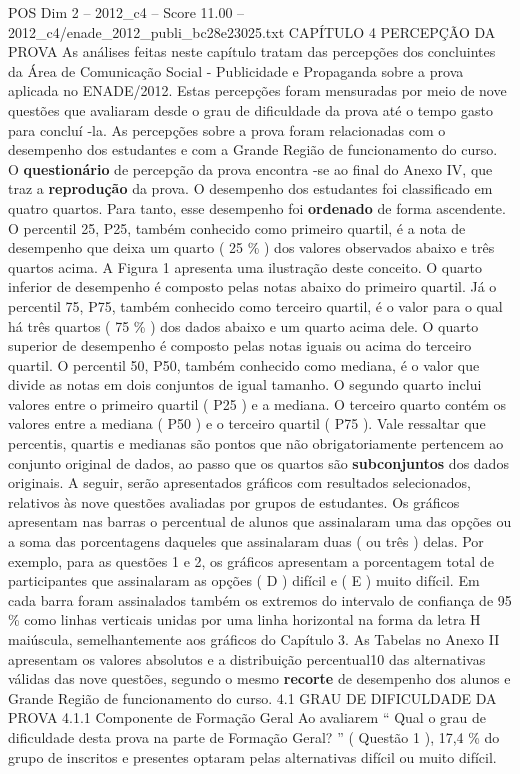 \begin{textsample}{POS Dim 2 – 2012\_c4 – Score 11.00 – 2012\_c4/enade\_2012\_publi\_bc28e23025.txt}  \label{ex:f2_pos_106}
CAPÍTULO 4 PERCEPÇÃO DA PROVA As análises feitas neste capítulo tratam das percepções dos concluintes da Área de Comunicação Social - Publicidade e Propaganda sobre a prova aplicada no ENADE/2012.
Estas percepções foram mensuradas por meio de nove questões que avaliaram desde o grau de dificuldade da prova até o tempo gasto para concluí -la.
As percepções sobre a prova foram relacionadas com o desempenho dos estudantes e com a Grande Região de funcionamento do curso.
O \textbf{questionário} de percepção da prova encontra -se ao final do Anexo IV, que traz a \textbf{reprodução} da prova.
O desempenho dos estudantes foi classificado em quatro quartos.
Para tanto, esse desempenho foi \textbf{ordenado} de forma ascendente.
O percentil 25, P25, também conhecido como primeiro quartil, é a nota de desempenho que deixa um quarto ( 25 \% ) dos valores observados abaixo e três quartos acima.
A Figura 1 apresenta uma ilustração deste conceito.
O quarto inferior de desempenho é composto pelas notas abaixo do primeiro quartil.
Já o percentil 75, P75, também conhecido como terceiro quartil, é o valor para o qual há três quartos ( 75 \% ) dos dados abaixo e um quarto acima dele.
O quarto superior de desempenho é composto pelas notas iguais ou acima do terceiro quartil.
O percentil 50, P50, também conhecido como mediana, é o valor que divide as notas em dois conjuntos de igual tamanho.
O segundo quarto inclui valores entre o primeiro quartil ( P25 ) e a mediana.
O terceiro quarto contém os valores entre a mediana ( P50 ) e o terceiro quartil ( P75 ).
Vale ressaltar que percentis, quartis e medianas são pontos que não obrigatoriamente pertencem ao conjunto original de dados, ao passo que os quartos são \textbf{subconjuntos} dos dados originais.
A seguir, serão apresentados gráficos com resultados selecionados, relativos às nove questões avaliadas por grupos de estudantes.
Os gráficos apresentam nas barras o percentual de alunos que assinalaram uma das opções ou a soma das porcentagens daqueles que assinalaram duas ( ou três ) delas.
Por exemplo, para as questões 1 e 2, os gráficos apresentam a porcentagem total de participantes que assinalaram as opções ( D ) difícil e ( E ) muito difícil.
Em cada barra foram assinalados também os extremos do intervalo de confiança de 95 \% como linhas verticais unidas por uma linha horizontal na forma da letra H maiúscula, semelhantemente aos gráficos do Capítulo 3.
As Tabelas no Anexo II apresentam os valores absolutos e a distribuição percentual10 das alternativas válidas das nove questões, segundo o mesmo \textbf{recorte} de desempenho dos alunos e Grande Região de funcionamento do curso. 4.1 GRAU DE DIFICULDADE DA PROVA 4.1.1 Componente de Formação Geral Ao avaliarem “ Qual o grau de dificuldade desta prova na parte de Formação Geral? ” ( Questão 1 ), 17,4 \% do grupo de inscritos e presentes optaram pelas alternativas difícil ou muito difícil.

\end{textsample}
